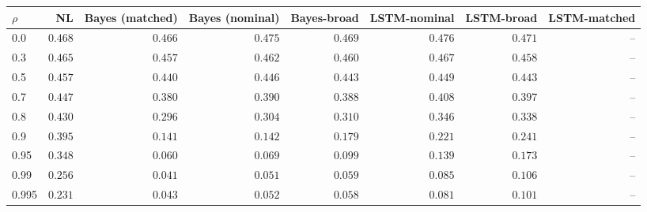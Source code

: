 \begin{tabular}{lrrrrrrr}
\toprule
$\rho$ & NL & Bayes (matched) & Bayes (nominal) & Bayes-broad & LSTM-nominal & LSTM-broad & LSTM-matched \\
\midrule
0.0 & $0.468$ & $0.466$ & $0.475$ & \textit{$0.469$} & $0.476$ & \textit{$0.471$} & -- \\
0.3 & $0.465$ & $0.457$ & $0.462$ & \textit{$0.460$} & $0.467$ & \textit{$0.458$} & -- \\
0.5 & $0.457$ & $0.440$ & $0.446$ & \textit{$0.443$} & $0.449$ & \textit{$0.443$} & -- \\
0.7 & $0.447$ & $0.380$ & $0.390$ & \textit{$0.388$} & $0.408$ & \textit{$0.397$} & -- \\
0.8 & $0.430$ & $0.296$ & $0.304$ & \textit{$0.310$} & $0.346$ & \textit{$0.338$} & -- \\
0.9 & $0.395$ & $0.141$ & $0.142$ & \textit{$0.179$} & $0.221$ & \textit{$0.241$} & -- \\
0.95 & $0.348$ & $0.060$ & $0.069$ & \textit{$0.099$} & $0.139$ & \textit{$0.173$} & -- \\
0.99 & $0.256$ & $0.041$ & $0.051$ & \textit{$0.059$} & $0.085$ & \textit{$0.106$} & -- \\
0.995 & $0.231$ & $0.043$ & $0.052$ & \textit{$0.058$} & $0.081$ & \textit{$0.101$} & -- \\
\bottomrule
\end{tabular}